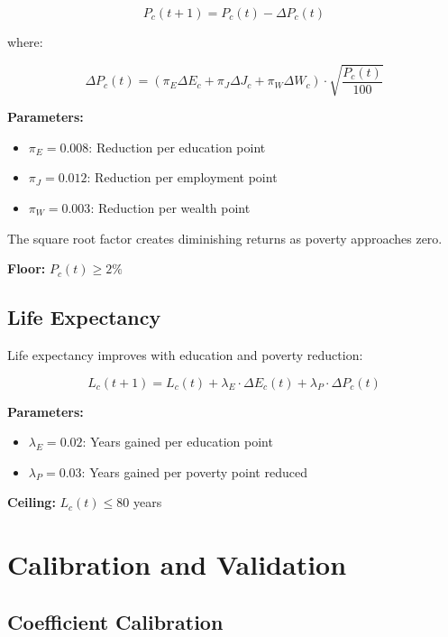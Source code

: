 \documentclass[10pt,twocolumn]{article}
\begin{document}
\begin{equation}
P_c(t+1) = P_c(t) - \Delta P_c(t)
\end{equation}

where:

\begin{equation}
\Delta P_c(t) = \left(\pi_E \Delta E_c + \pi_J \Delta J_c + \pi_W \Delta W_c\right) \cdot \sqrt{\frac{P_c(t)}{100}}
\end{equation}

\textbf{Parameters:}
\begin{itemize}
    \item $\pi_E = 0.008$: Reduction per education point
    \item $\pi_J = 0.012$: Reduction per employment point
    \item $\pi_W = 0.003$: Reduction per wealth point
\end{itemize}

The square root factor creates diminishing returns as poverty approaches zero.

\textbf{Floor:} $P_c(t) \geq 2\%$

\subsection{Life Expectancy}

Life expectancy improves with education and poverty reduction:

\begin{equation}
L_c(t+1) = L_c(t) + \lambda_E \cdot \Delta E_c(t) + \lambda_P \cdot \Delta P_c(t)
\end{equation}

\textbf{Parameters:}
\begin{itemize}
    \item $\lambda_E = 0.02$: Years gained per education point
    \item $\lambda_P = 0.03$: Years gained per poverty point reduced
\end{itemize}

\textbf{Ceiling:} $L_c(t) \leq 80$ years

\section{Calibration and Validation}

\subsection{Coefficient Calibration}
\end{document}
